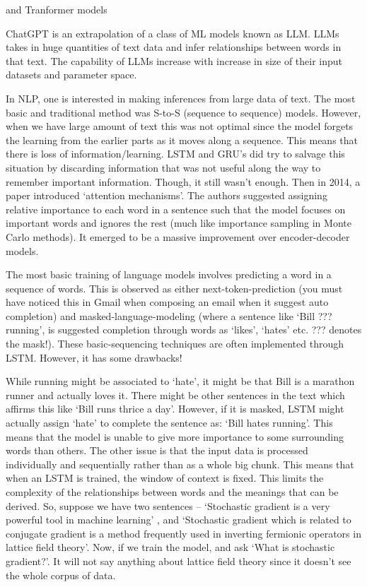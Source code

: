 \documentclass[11pt]{article}
\begin{document}
and Tranformer models


ChatGPT is an extrapolation of a class of ML models known as LLM. LLMs takes in 
huge quantities of text data and infer relationships between words in that text. 
The capability of LLMs increase with increase in size of their input datasets and parameter space. 


In NLP, one is interested in making inferences from large data of text. 
The most basic and traditional method was S-to-S (sequence to sequence) models. 
However, when we have large amount of text this was not optimal since the model 
forgets the learning from the earlier parts as it moves along a sequence. This means 
that there is loss of information/learning. LSTM and GRU's did try to salvage this situation 
by discarding information that was not useful along the way to remember important information. 
Though, it still wasn’t enough. Then in 2014, a paper introduced `attention mechanisms'. 
The authors suggested assigning relative importance to each word in a sentence such that the 
model focuses on important words and ignores the rest (much like importance sampling in Monte Carlo methods). 
It emerged to be a massive improvement over encoder-decoder models. 


The most basic training of language models involves predicting a word in a 
sequence of words. This is observed as either next-token-prediction (you must have noticed this in Gmail when composing an email when it suggest auto completion) 
and masked-language-modeling (where a sentence like `Bill ??? running', is suggested completion through words as `likes', `hates' etc. ??? denotes the mask!). 
These basic-sequencing techniques are often implemented through LSTM. However, it has some drawbacks! 

While running might be associated to `hate', it might be that Bill is a marathon runner and actually loves it. There might be other sentences in the text
which affirms this like `Bill runs thrice a day'. However, if it is masked, LSTM might actually assign `hate' to complete the sentence as:
`Bill hates running'. This means that the model is unable to give more importance to some surrounding words than others. 
The other issue is that the input data is processed individually and sequentially rather than as a whole big chunk. 
This means that when an LSTM is trained, the window of context is fixed. This limits the complexity of the relationships between words and the meanings that can be derived.
So, suppose we have two sentences -- `Stochastic gradient is a very powerful tool in machine learning' , and `Stochastic gradient which is related to conjugate gradient 
is a method frequently used in inverting fermionic operators in lattice field theory'. Now, if we train the model, and ask `What is stochastic gradient?'. It will not 
say anything about lattice field theory since it doesn't see the whole corpus of data. 
\end{document}
